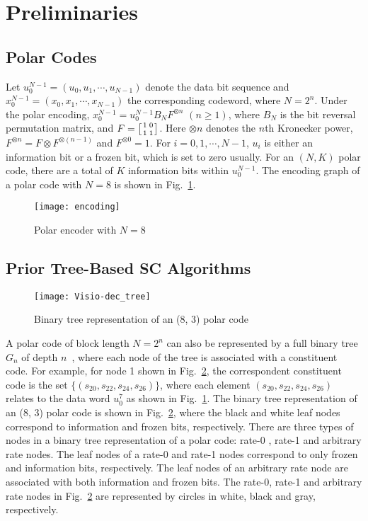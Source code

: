 \documentclass[journal]{IEEEtran}
\begin{document}
\section{Preliminaries}
\label{sec: pre}

\subsection{Polar Codes} \label{ssec:polar_encoding}
Let $u_0^{N-1} = (u_0,u_1,\cdots,u_{N-1})$ denote the data bit sequence and $x_0^{N-1} = (x_0,x_1,\cdots,x_{N-1})$ the corresponding codeword, where $N=2^n$. Under the polar encoding, $x_0^{N-1} = u_0^{N-1}B_NF^{\otimes n}$ $(n\geqslant1)$, where $B_N$ is the bit reversal permutation matrix, and $F=\left[{1\atop 1}{0\atop 1}\right]$. Here $\otimes n$ denotes the $n$th Kronecker power, $F^{\otimes n} = F\otimes F^{\otimes (n-1)}$ and $F^{\otimes0}=1$.
For $i=0,1,\cdots,N-1$, $u_i$ is either an information bit or a frozen bit, which is set to zero usually. For an $(N,K)$ polar code, there are a total of $K$ information bits within $u_0^{N-1}$.
The encoding graph of a polar code with $N=8$ is shown in Fig.~\ref{fig: encoding}.

\begin{figure} [hbt]
\centering
\texttt{[image: encoding]}
  \caption{Polar encoder with $N=8$}\label{fig: encoding}
\end{figure}

\subsection{Prior Tree-Based SC Algorithms} \label{ssec: ssc}

\begin{figure} [hbt]
\centering
\texttt{[image: Visio-dec\_tree]}
  \caption{Binary tree representation of an (8, 3) polar code}\label{fig: dec_tree}
\end{figure}

A polar code of block length $N=2^n$ can also be represented by a full binary tree $G_n$ of depth $n$~\cite{low_latency_polar}, where each node of the tree is associated with a constituent code. For example, for node 1 shown in Fig.~\ref{fig: dec_tree}, the correspondent constituent code is the set $\{(s_{20},s_{22},s_{24},s_{26})\}$, where each element $(s_{20},s_{22},s_{24},s_{26})$ relates to the data word $u_0^{7}$ as shown in Fig.~\ref{fig: encoding}. The binary tree representation of an (8, 3) polar code is shown in Fig.~\ref{fig: dec_tree}, where the black and white leaf nodes correspond to information and frozen bits, respectively. There are three types of nodes in a binary tree representation of a polar code: rate-0 , rate-1 and arbitrary rate nodes. The leaf nodes of a rate-0 and rate-1 nodes correspond to only frozen and information bits, respectively. The leaf nodes of an arbitrary rate node are associated with both information and frozen bits. The rate-0, rate-1 and arbitrary rate nodes in Fig.~\ref{fig: dec_tree} are represented by circles in white, black and gray, respectively.
\end{document}

